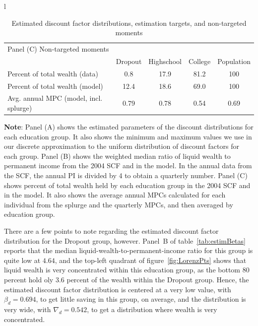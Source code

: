 \documentclass[\econtexRoot/HAFiscal]{subfiles}
\begin{document}
\begin{table}[tp]
\begin{center}
\begin{tabular}{l}
      \begin{tabular}{lcccc}
        \multicolumn{5}{l}{Panel (C) Non-targeted moments} \\ 
        & Dropout & Highschool & College & Population \\ \midrule
        Percent of total wealth (data) & 0.8 & 17.9 & 81.2 & 100 \\
        Percent of total wealth (model) & 12.4 & 18.6 & 69.0 & 100 \\
        Avg. annual MPC (model, incl. splurge) & 0.79 & 0.78 & 0.54 & 0.69
        \\ \bottomrule 
      \end{tabular}
    \end{tabular}
    \caption{Estimated discount factor distributions, estimation targets, and non-targeted moments}
    \notinsubfile{\label{tab:estimBetas}}
    \parbox{16cm}{\small \vspace{.15cm} \textbf{Note}: Panel (A) shows the estimated parameters of the discount distributions for each education group. It also shows the minimum and maximum values we use in our discrete approximation to the uniform distribution of discount factors for each group. Panel (B) shows the weighted median ratio of liquid wealth to permanent income from the 2004 SCF and in the model. In the annual data from the SCF, the annual PI is divided by 4 to obtain a quarterly number. Panel (C) shows percent of total wealth held by each education group in the 2004 SCF and in the model. It also shows the average annual MPCs calculated for each individual from the splurge and the quarterly MPCs, and then averaged by education group.\normalsize}
  \end{center}
\end{table}

There are a few points to note regarding the estimated discount factor distribution for the Dropout group, however. Panel~B of table~\ref{tab:estimBetas} reports that the median liquid-wealth-to-permanent-income ratio for this group is quite low at $4.64$, and the top-left quadrant of figure~\ref{fig:LorenzPts} shows that liquid wealth is very concentrated within this education group, as the bottom 80 percent  hold oly $3.6$ percent of the wealth within the Dropout group. Hence, the estimated discount factor distribution is centered at a very low value, with $\beta_d=0.694$, to get little saving in this group, on average, and the distribution is very wide, with $\nabla_d=0.542$, to get a distribution where wealth is very concentrated. 
\end{document}
